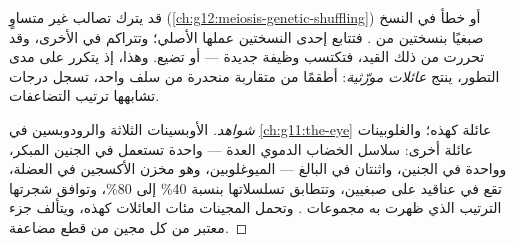 \begin{proposition}\label{prop:g12:diversification-of-life:duplication}
قد يترك تصالب غير متساوٍ (\cref{ch:g12:meiosis-genetic-shuffling}) أو
خطأ في النسخ صبغيًا بنسختين من . فتتابع إحدى النسختين عملها
الأصلي؛ وتتراكم في الأخرى، وقد تحررت من ذلك القيد،  فتكتسب وظيفة
جديدة --- أو تضيع. وهذا، إذ يتكرر على مدى التطور، ينتج \emph{عائلات
مورّثية}: أطقمًا من  متقاربة منحدرة من سلف
واحد، تسجل درجات تشابهها ترتيب التضاعفات.
\end{proposition}
\begin{proof}[شواهد]
الأوبسينات الثلاثة والرودوبسين في \cref{ch:g11:the-eye} عائلة كهذه؛
والغلوبينات عائلة أخرى:  سلاسل الخضاب الدموي العدة --- واحدة
تستعمل في الجنين المبكر، وواحدة في الجنين، واثنتان في البالغ ---
 الميوغلوبين، وهو مخزن الأكسجين في العضلة، تقع في عناقيد على
صبغيين، وتتطابق تسلسلاتها بنسبة 40\% إلى 80\%، وتوافق شجرتها الترتيب
الذي ظهرت به مجموعات . وتحمل المجينات مئات العائلات كهذه،
ويتألف جزء معتبر من كل مجين من قطع مضاعفة.
\end{proof}


